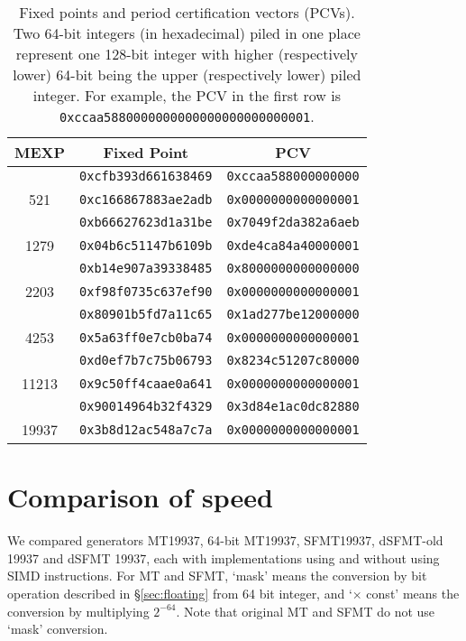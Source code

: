 \documentclass{svmult}
\begin{document}
\begin{table}
  \begin{center}
    \caption{Fixed points and period certification vectors (PCVs). 
      Two 64-bit integers (in hexadecimal) piled in one place represent one 128-bit 
      integer with higher (respectively lower) 64-bit being the upper 
      (respectively lower) piled integer. For example, the PCV in the first
      row is \texttt{0xccaa5880000000000000000000000001}.
    }
    \label{tab:pcv}
    \begin{tabular}{c||c|c} \hline
      MEXP & Fixed Point %
      & PCV \\ \hline \hline %
      & \texttt{0xcfb393d661638469} & \texttt{0xccaa588000000000} \\
      521 & \texttt{0xc166867883ae2adb} &\texttt{0x0000000000000001} \\ \hline
      & \texttt{0xb66627623d1a31be} & \texttt{0x7049f2da382a6aeb} \\
      1279 & \texttt{0x04b6c51147b6109b} & \texttt{0xde4ca84a40000001} \\ \hline
      & \texttt{0xb14e907a39338485} & \texttt{0x8000000000000000} \\
      2203 & \texttt{0xf98f0735c637ef90} & \texttt{0x0000000000000001} \\ \hline
      & \texttt{0x80901b5fd7a11c65} & \texttt{0x1ad277be12000000} \\
      4253 & \texttt{0x5a63ff0e7cb0ba74} & \texttt{0x0000000000000001} \\ \hline
      & \texttt{0xd0ef7b7c75b06793} & \texttt{0x8234c51207c80000} \\
      11213 & \texttt{0x9c50ff4caae0a641} & \texttt{0x0000000000000001}\\ \hline
      & \texttt{0x90014964b32f4329} & \texttt{0x3d84e1ac0dc82880} \\
      19937 & \texttt{0x3b8d12ac548a7c7a} & \texttt{0x0000000000000001} \\ 
      \hline
    \end{tabular}
  \end{center}
\end{table}

\section{Comparison of speed}\label{sec:comp-speed}
We compared generators MT19937, 64-bit MT19937, SFMT19937, dSFMT-old
19937 and dSFMT 19937, each with implementations using and
without using SIMD instructions. For MT and SFMT, `mask' means the
conversion by bit operation described in \S\ref{sec:floating} from 64
bit integer, %
and `$\times$ const' means the
conversion by multiplying $2^{-64}$. Note that original MT and SFMT
do not use `mask' conversion.
\end{document}

